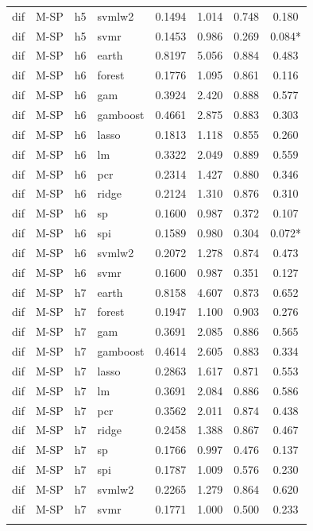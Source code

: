 \begin{ThreePartTable}
\begin{longtable}[t]{llclcccc}
dif & M-SP & h5 & svmlw2 & 0.1494 & 1.014 & 0.748 & 0.180\\
dif & M-SP & h5 & svmr & 0.1453 & 0.986 & 0.269 & 0.084*\\
\addlinespace
dif & M-SP & h6 & earth & 0.8197 & 5.056 & 0.884 & 0.483\\
dif & M-SP & h6 & forest & 0.1776 & 1.095 & 0.861 & 0.116\\
dif & M-SP & h6 & gam & 0.3924 & 2.420 & 0.888 & 0.577\\
dif & M-SP & h6 & gamboost & 0.4661 & 2.875 & 0.883 & 0.303\\
dif & M-SP & h6 & lasso & 0.1813 & 1.118 & 0.855 & 0.260\\
dif & M-SP & h6 & lm & 0.3322 & 2.049 & 0.889 & 0.559\\
dif & M-SP & h6 & pcr & 0.2314 & 1.427 & 0.880 & 0.346\\
dif & M-SP & h6 & ridge & 0.2124 & 1.310 & 0.876 & 0.310\\
dif & M-SP & h6 & sp & 0.1600 & 0.987 & 0.372 & 0.107\\
dif & M-SP & h6 & spi & 0.1589 & 0.980 & 0.304 & 0.072*\\
dif & M-SP & h6 & svmlw2 & 0.2072 & 1.278 & 0.874 & 0.473\\
dif & M-SP & h6 & svmr & 0.1600 & 0.987 & 0.351 & 0.127\\
\addlinespace
dif & M-SP & h7 & earth & 0.8158 & 4.607 & 0.873 & 0.652\\
dif & M-SP & h7 & forest & 0.1947 & 1.100 & 0.903 & 0.276\\
dif & M-SP & h7 & gam & 0.3691 & 2.085 & 0.886 & 0.565\\
dif & M-SP & h7 & gamboost & 0.4614 & 2.605 & 0.883 & 0.334\\
dif & M-SP & h7 & lasso & 0.2863 & 1.617 & 0.871 & 0.553\\
dif & M-SP & h7 & lm & 0.3691 & 2.084 & 0.886 & 0.586\\
dif & M-SP & h7 & pcr & 0.3562 & 2.011 & 0.874 & 0.438\\
dif & M-SP & h7 & ridge & 0.2458 & 1.388 & 0.867 & 0.467\\
dif & M-SP & h7 & sp & 0.1766 & 0.997 & 0.476 & 0.137\\
dif & M-SP & h7 & spi & 0.1787 & 1.009 & 0.576 & 0.230\\
dif & M-SP & h7 & svmlw2 & 0.2265 & 1.279 & 0.864 & 0.620\\
dif & M-SP & h7 & svmr & 0.1771 & 1.000 & 0.500 & 0.233\\
\addlinespace

\end{longtable}
\end{ThreePartTable}
